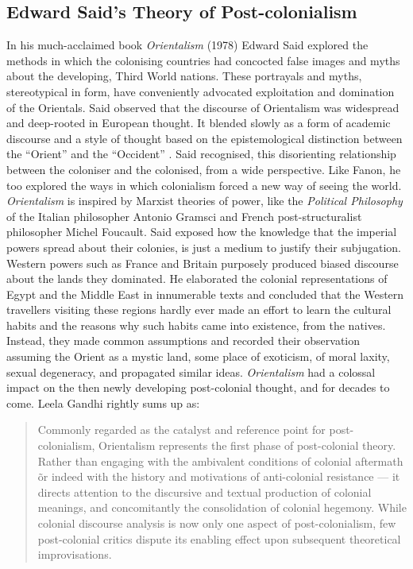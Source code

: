 \subsection{Edward Said’s Theory of Post-colonialism}

In his much-acclaimed book \emph{Orientalism} (1978) Edward Said explored the methods in which the colonising countries had concocted false images and myths about the developing, Third World nations. These portrayals and myths, stereotypical in form, have conveniently advocated exploitation and domination of the Orientals. Said observed that the discourse of Orientalism was widespread and deep-rooted in European thought. It blended slowly as a form of academic discourse and a style of thought based on the epistemological distinction between the “Orient” and the “Occident” \parencite{Said1979}. Said recognised, this disorienting relationship between the coloniser and the colonised, from a wide perspective. Like Fanon, he too explored the ways in which colonialism forced a new way of seeing the world. \emph{Orientalism} is inspired by Marxist theories of power, like the \emph{Political Philosophy} of the Italian philosopher Antonio Gramsci and French post-structuralist philosopher Michel Foucault. Said exposed how the knowledge that the imperial powers spread about their colonies, is just a medium to justify their subjugation. Western powers such as France and Britain purposely produced biased discourse about the lands they dominated. He elaborated the colonial representations of Egypt and the Middle East in innumerable texts and concluded that the Western travellers visiting these regions hardly ever made an effort to learn the cultural habits and the reasons why such habits came into existence, from the natives. Instead, they made common assumptions and recorded their observation assuming the Orient as a mystic land, some place of exoticism, of moral laxity, sexual degeneracy, and propagated similar ideas. \emph{Orientalism} had a colossal impact on the then newly developing post-colonial thought, and for decades to come. Leela Gandhi rightly sums up as: 

\begin{quote}
 Commonly regarded as the catalyst and reference point for post-colonialism, Orientalism represents the first phase of post-colonial theory. Rather than engaging with the ambivalent conditions of colonial aftermath \~ or indeed with the history and motivations of anti-colonial resistance — it directs attention to the discursive and textual production of colonial meanings, and concomitantly the consolidation of colonial hegemony. While colonial discourse analysis is now only one aspect of post-colonialism, few post-colonial critics dispute its enabling effect upon subsequent theoretical improvisations. \parencite{Gandhi1998}
\end{quote}

